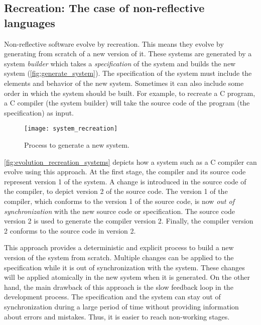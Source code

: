 \subsection{Recreation: The case of non-reflective languages}

Non-reflective software evolve by recreation. This means they evolve by generating from scratch of a new version of it. These systems are generated by a system \emph{builder} which takes a \emph{specification} of the system and builds the new system (\autoref{fig:generate_system}).
The specification of the system must include the elements and behavior of the new system. Sometimes it can also include some order in which the system should be built.
For example, to recreate a C program, a C compiler (the system builder) will take the source code of the program (the specification) as input.

\begin{figure}[!ht]
\begin{center}
\texttt{[image: system\_recreation]}
\caption{Process to generate a new system.\label{fig:generate_system}}
\end{center}
\end{figure}

\autoref{fig:evolution_recreation_systems} depicts how a system such as a C compiler can evolve using this approach.
At the first stage, the compiler and its source code represent version 1 of the system.
A change is introduced in the source code of the compiler, to depict version 2 of the source code.
The version 1 of the compiler, which conforms to the version 1 of the source code, is now \emph{out of synchronization} with the new source code or specification.
The source code version 2 is used to generate the compiler version 2.
Finally, the compiler version 2 conforms to the source code in version 2.


This approach provides a deterministic and explicit process to build a new version of the system from scratch.
Multiple changes can be applied to the specification while it is out of synchronization with the system.
These changes will be applied atomically in the new system when it is generated.
On the other hand, the main drawback of this approach is the slow feedback loop in the development process.
The specification and the system can stay out of synchronization during a large period of time without providing information about errors and mistakes.
Thus, it is easier to reach non-working stages.

